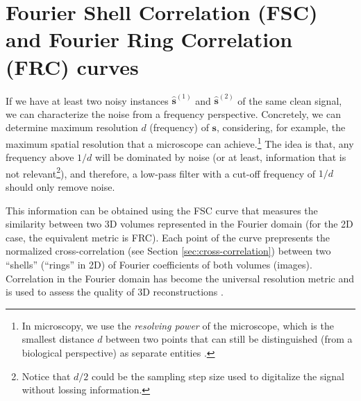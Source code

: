 
\section{Fourier Shell Correlation (FSC) and Fourier Ring
  Correlation (FRC) curves}
\label{sec:fourier_correlation}

If we have at least two noisy instances $\hat{\mathbf{s}}^{(1)}$ and
$\hat{\mathbf{s}}^{(2)}$ of the same clean signal, we can characterize
the noise from a frequency perspective. Concretely, we can determine
maximum resolution $d$ (frequency) of $\mathbf{s}$, considering, for
example, the maximum spatial resolution that a microscope can
achieve.\footnote{In microscopy, we use the \emph{resolving power} of
  the microscope, which is the smallest distance $d$ between two
  points that can still be distinguished (from a biological
  perspective) as separate entities
  \cite{nieuwenhuizen2013measuring}.} The idea is that, any frequency
above $1/d$ will be dominated by noise (or at least, information that
is not relevant\footnote{Notice that $d/2$ could be the sampling step
  size used to digitalize the signal without lossing information.}),
and therefore, a low-pass filter with a cut-off frequency of $1/d$
should only remove noise.

This information can be obtained using the \gls{FSC}
curve that measures the similarity between two 3D volumes represented in
the Fourier domain \cite{verbeke2024self} (for the 2D case, the
equivalent metric is \gls{FRC}). Each point of the curve prepresents
the normalized cross-correlation (see Section
\ref{sec:cross-correlation}) between two ``shells'' (``rings'' in 2D)
of Fourier coefficients of both volumes (images). Correlation in the
Fourier domain has become the universal resolution metric and is used
to assess the quality of 3D reconstructions
\cite{rosenthal2003optimal,scheres2012prevention}.

\begin{comment}
An advantage of correlation in the Fourier domain (FC\footnote{When
  the number of dimensions is not relevant, we will refer to this
  metric simply by FC (Fourier Correlation).}) over other similarity
metrics such as RMSE, SSIM or PPC is that FC values depend on the
frequency, and this can be interesting in some scenarios, such as
microscopy, where the resolution of the microscope is finite and known
a priori \cite{nieuwenhuizen2013measuring}. Notice that, with this
information, we can know whether the denoising is removing the
high-frequency components of the clean signal, or on the contrary,
basically noise.\footnote{When the SNR is very low, the Fourier
  coefficients of the same ring/shell of two different noisy versions
  of the same signal are uncorrelated and therefore, the corresponding
  curves values should be close to zero.}  For this reason, in some
fields such as single particle electron cryo-microscopy (cryo-EM),
\end{comment}

